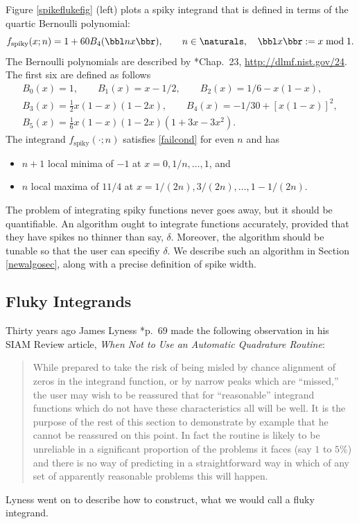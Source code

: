 \documentclass[]{amsart}
\theoremstyle{definition}
\theoremstyle{remark}
\begin{document}
Figure \ref{spikeflukefig} (left) plots a spiky integrand that is defined in terms of the quartic Bernoulli polynomial:
\begin{equation} \label{spiky}
f_{\text{spiky}}(x;n) = 1 + 60 B_4(\bbl nx \bbr), \qquad n \in \naturals, \quad \bbl x \bbr := x \bmod 1.
\end{equation}
The Bernoulli polynomials are described by *{Chap.\ 23, \url{http://dlmf.nist.gov/24}}.  The first six are defined as follows 
\begin{subequations} \label{Bernoulli}
\begin{gather} 
B_0(x) = 1, \qquad B_1(x) = x-1/2,  \qquad 
B_2(x)=1/6 - x(1-x), \\ 
B_3(x) = \frac{1}{2} x(1-x)(1-2x), \qquad B_4(x) = -1/30 + [x(1-x)]^2, \\
B_5(x) = \frac{1}{6} x(1-x)(1-2x)(1 + 3 x - 3 x^2).
\end{gather}
\end{subequations}
The integrand $f_{\text{spiky}}(\cdot;n)$ satisfies \eqref{failcond} for even $n$ and has 
\begin{itemize}
\item $n+1$ local minima of $-1$ at $x=0, 1/n, \ldots, 1$, and
\item $n$ local maxima of $11/4$ at $x=1/(2n), 3/(2n), \ldots, 1-1/(2n)$.
\end{itemize}

The problem of integrating spiky functions never goes away, but it should be quantifiable.  An algorithm ought to integrate functions accurately, provided that they have spikes no thinner than say, $\delta$.  Moreover, the algorithm should be tunable so that the user can specifiy $\delta$.  We describe such an algorithm in Section \ref{newalgosec}, along with a precise definition of spike width.

\subsection{Fluky Integrands} 

Thirty years ago James Lyness *{p.\ 69} made the following observation in his SIAM Review article, \emph{When Not to Use an Automatic Quadrature Routine}:
\begin{quote}
While prepared to take the risk of being misled by chance alignment of zeros in the integrand function, or by narrow peaks which are ``missed,'' the user may wish to be reassured that for ``reasonable'' integrand functions which do not have these characteristics all will be well. It is the purpose of the rest of this section to demonstrate by example that he cannot be reassured on this point. In fact the routine is likely to be unreliable in a significant proportion of the problems it faces (say $1$ to $5\%$) and there is no way of predicting in a straightforward way in which of any set of apparently reasonable problems this will happen.
\end{quote}
Lyness went on to describe how to construct, what we would call a fluky integrand.  
\end{document}
